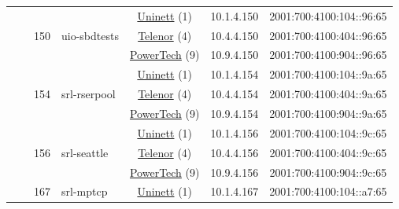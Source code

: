 \begin{small}
\begin{center}
\begin{longtable}{|c|c|c|c|c|c|c|c|}
  &  & \multirow{3}{*}{\tiny{150}} & \multicolumn{1}{|l|}{\multirow{3}{*}{\tiny{uio-sbdtests}}} & \multicolumn{2}{|c|}{\tiny{\href{https://www.uninett.no}{Uninett} (1)}} & \tiny{10.1.4.150} & \tiny{2001:700:4100:104::96:65} \\* \cline{5-5}\cline{6-6}\cline{7-7}\cline{8-8}
  &  &  &  & \multicolumn{2}{|c|}{\tiny{\href{https://www.telenor.no}{Telenor} (4)}} & \tiny{10.4.4.150} & \tiny{2001:700:4100:404::96:65} \\* \cline{5-5}\cline{6-6}\cline{7-7}\cline{8-8}
  &  &  &  & \multicolumn{2}{|c|}{\tiny{\href{http://www.powertech.no}{PowerTech} (9)}} & \tiny{10.9.4.150} & \tiny{2001:700:4100:904::96:65} \\* \cline{3-3}\cline{4-4}\cline{5-5}\cline{6-6}\cline{7-7}\cline{8-8}
  &  & \multirow{3}{*}{\tiny{154}} & \multicolumn{1}{|l|}{\multirow{3}{*}{\tiny{srl-rserpool}}} & \multicolumn{2}{|c|}{\tiny{\href{https://www.uninett.no}{Uninett} (1)}} & \tiny{10.1.4.154} & \tiny{2001:700:4100:104::9a:65} \\* \cline{5-5}\cline{6-6}\cline{7-7}\cline{8-8}
  &  &  &  & \multicolumn{2}{|c|}{\tiny{\href{https://www.telenor.no}{Telenor} (4)}} & \tiny{10.4.4.154} & \tiny{2001:700:4100:404::9a:65} \\* \cline{5-5}\cline{6-6}\cline{7-7}\cline{8-8}
  &  &  &  & \multicolumn{2}{|c|}{\tiny{\href{http://www.powertech.no}{PowerTech} (9)}} & \tiny{10.9.4.154} & \tiny{2001:700:4100:904::9a:65} \\* \cline{3-3}\cline{4-4}\cline{5-5}\cline{6-6}\cline{7-7}\cline{8-8}
  &  & \multirow{3}{*}{\tiny{156}} & \multicolumn{1}{|l|}{\multirow{3}{*}{\tiny{srl-seattle}}} & \multicolumn{2}{|c|}{\tiny{\href{https://www.uninett.no}{Uninett} (1)}} & \tiny{10.1.4.156} & \tiny{2001:700:4100:104::9c:65} \\* \cline{5-5}\cline{6-6}\cline{7-7}\cline{8-8}
  &  &  &  & \multicolumn{2}{|c|}{\tiny{\href{https://www.telenor.no}{Telenor} (4)}} & \tiny{10.4.4.156} & \tiny{2001:700:4100:404::9c:65} \\* \cline{5-5}\cline{6-6}\cline{7-7}\cline{8-8}
  &  &  &  & \multicolumn{2}{|c|}{\tiny{\href{http://www.powertech.no}{PowerTech} (9)}} & \tiny{10.9.4.156} & \tiny{2001:700:4100:904::9c:65} \\* \cline{3-3}\cline{4-4}\cline{5-5}\cline{6-6}\cline{7-7}\cline{8-8}
  &  & \multirow{3}{*}{\tiny{167}} & \multicolumn{1}{|l|}{\multirow{3}{*}{\tiny{srl-mptcp}}} & \multicolumn{2}{|c|}{\tiny{\href{https://www.uninett.no}{Uninett} (1)}} & \tiny{10.1.4.167} & \tiny{2001:700:4100:104::a7:65} \\* \cline{5-5}\cline{6-6}\cline{7-7}\cline{8-8}

\end{longtable}
\end{center}
\end{small}
